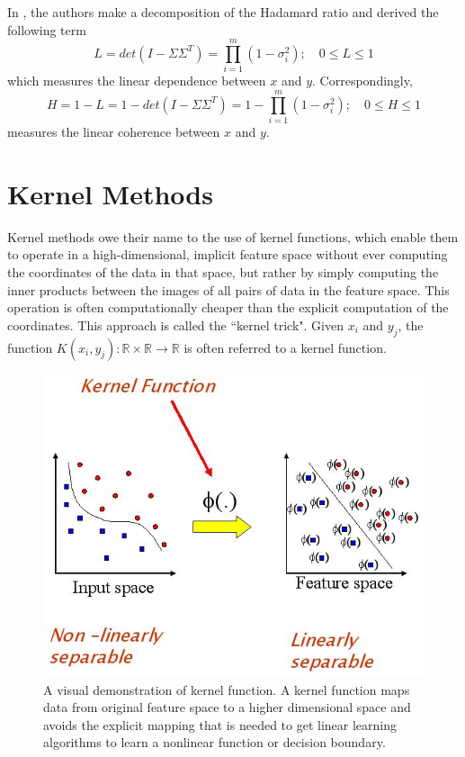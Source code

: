 \documentclass[12pt]{report} %
\begin{document}
In \cite{ECCA}, the authors make a decomposition of the Hadamard ratio and derived the following term
\begin{equation}
L=det(I-\Sigma\Sigma^T)=\prod_{i=1}^{m}(1-\sigma_{i}^2);\quad 0\leq L\leq 1
\end{equation}
which measures the linear dependence between $x$ and $y$. Correspondingly,
\begin{equation}
H=1-L=1-det(I-\Sigma\Sigma^T)=1-\prod_{i=1}^{m}(1-\sigma_{i}^2);\quad 0\leq H\leq 1
\end{equation}
measures the linear coherence between $x$ and $y$.

\section{Kernel Methods}
Kernel methods owe their name to the use of kernel functions, which enable them to operate in a high-dimensional, implicit feature space without ever computing the coordinates of the data in that space, but rather by simply computing the inner products between the images of all pairs of data in the feature space. This operation is often computationally cheaper than the explicit computation of the coordinates. This approach is called the ``kernel trick"\cite{PR}. Given $x_{i}$ and $y_{j}$, the function $K(x_{i},y_{j}): \mathbb{R} \times \mathbb{R} \to \mathbb{R}$ is often referred to a kernel function.
\begin{figure}[H]
	\centering
	\includegraphics[scale=0.6]{pictures/kernel.jpg}
	\caption{A visual demonstration of kernel function. A kernel function maps data from original feature space to a higher dimensional space and avoids the explicit mapping that is needed to get linear learning algorithms to learn a nonlinear function or decision boundary\cite{KPIC}.}
	\label{fig:4}
\end{figure}
\end{document}
